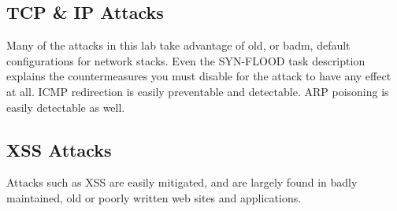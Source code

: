 \subsection{TCP \& IP Attacks}
Many of the attacks in this lab take advantage of old, or badm, default configurations for network stacks.
Even the SYN-FLOOD task description explains the countermeasures you must disable for the attack to have any effect at
all. ICMP redirection is easily preventable and detectable. ARP poisoning is easily detectable as well.

\subsection{XSS Attacks}
Attacks such as XSS are easily mitigated,\cite{cheatsheet} and are largely found in badly maintained, old or poorly written web sites
and applications.
